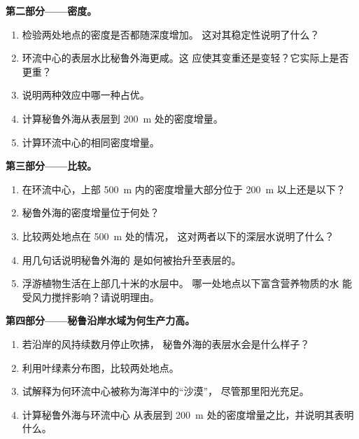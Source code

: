 \begin{problem}
\medskip
\noindent\textbf{第二部分——密度。}
\begin{enumerate}[resume]
  \item 检验两处地点的密度是否都随深度增加。
        这对其稳定性说明了什么？
  \item 环流中心的表层水比秘鲁外海更咸。这
        应使其变重还是变轻？它实际上是否更重？
  \item 说明两种效应中哪一种占优。
  \item 计算秘鲁外海从表层到 \qty{200}{m}
        处的密度增量。
  \item 计算环流中心的相同密度增量。
\end{enumerate}

\medskip
\noindent\textbf{第三部分——比较。}
\begin{enumerate}[resume]
  \item 在环流中心，上部
        \qty{500}{m} 内的密度增量大部分位于 \qty{200}{m} 以上还是以下？
  \item 秘鲁外海的密度增量位于何处？
  \item 比较两处地点在 \qty{500}{m} 处的情况，
        这对两者以下的深层水说明了什么？
  \item 用几句话说明秘鲁外海的
        是如何被抬升至表层的。
  \item 浮游植物生活在上部几十米的水层中。
        哪一处地点以下富含营养物质的水
        能受风力搅拌影响？请说明理由。
\end{enumerate}

\medskip
\noindent\textbf{第四部分——秘鲁沿岸水域为何生产力高。}
\begin{enumerate}[resume]
  \item 若沿岸的风持续数月停止吹拂，
        秘鲁外海的表层水会是什么样子？
  \item 利用叶绿素分布图，比较两处地点。
  \item 试解释为何环流中心被称为海洋中的“沙漠”，
        尽管那里阳光充足。
  \item 计算秘鲁外海与环流中心
        从表层到 \qty{200}{m} 处的密度增量之比，并说明其表明什么。
\end{enumerate}
\end{problem}
